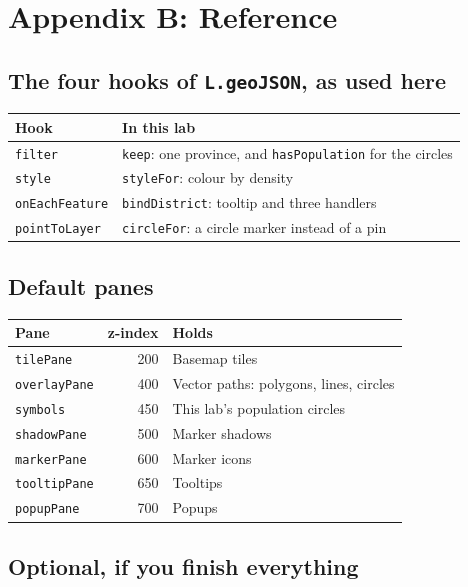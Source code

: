\documentclass{article}
\newcommand{\cd}[1]{\texttt{#1}}
\begin{document}
\section*{Appendix B: Reference}

\subsection*{The four hooks of \texttt{L.geoJSON}, as used here}

\begin{tabularx}{\textwidth}{@{}L{3.4cm} X@{}}
\toprule
\textbf{Hook} & \textbf{In this lab} \\
\midrule
\cd{filter}        & \cd{keep}: one province, and \cd{hasPopulation} for
                     the circles \\
\cd{style}         & \cd{styleFor}: colour by density \\
\cd{onEachFeature} & \cd{bindDistrict}: tooltip and three handlers \\
\cd{pointToLayer}  & \cd{circleFor}: a circle marker instead of a pin \\
\bottomrule
\end{tabularx}

\subsection*{Default panes}

\begin{tabularx}{\textwidth}{@{}L{4cm} r X@{}}
\toprule
\textbf{Pane} & \textbf{z-index} & \textbf{Holds} \\
\midrule
\cd{tilePane}    & 200 & Basemap tiles \\
\cd{overlayPane} & 400 & Vector paths: polygons, lines, circles \\
\cd{symbols}     & 450 & This lab's population circles \\
\cd{shadowPane}  & 500 & Marker shadows \\
\cd{markerPane}  & 600 & Marker icons \\
\cd{tooltipPane} & 650 & Tooltips \\
\cd{popupPane}   & 700 & Popups \\
\bottomrule
\end{tabularx}

\subsection*{Optional, if you finish everything}
\end{document}
